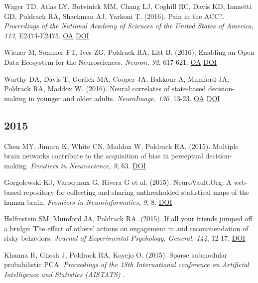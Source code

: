 \documentclass[10pt, letterpaper]{article}
\begin{document}
Wager TD, Atlas LY, Botvinick MM, Chang LJ, Coghill RC, Davis KD, Iannetti GD, Poldrack RA, Shackman AJ, Yarkoni T.  (2016). Pain in the ACC?. \textit{Proceedings of the National Academy of Sciences of the United States of America, 113}, E2474-E2475. \href{https://www.ncbi.nlm.nih.gov/pmc/articles/PMC4983860}{OA} \href{https://doi.org/10.1073/pnas.1600282113}{DOI} \vspace{2mm}

Wiener M, Sommer FT, Ives ZG, Poldrack RA, Litt B.  (2016). Enabling an Open Data Ecosystem for the Neurosciences. \textit{Neuron, 92}, 617-621. \href{https://doi.org/10.1016/j.neuron.2016.10.037}{OA} \href{https://doi.org/10.1016/j.neuron.2016.10.037}{DOI} \vspace{2mm}

Worthy DA, Davis T, Gorlick MA, Cooper JA, Bakkour A, Mumford JA, Poldrack RA, Maddox W.  (2016). Neural correlates of state-based decision-making in younger and older adults. \textit{NeuroImage, 130}, 13-23. \href{https://www.ncbi.nlm.nih.gov/pmc/articles/PMC4808466}{OA} \href{https://doi.org/10.1016/j.neuroimage.2015.12.004}{DOI} \vspace{2mm}

\subsection*{2015}Chen MY, Jimura K, White CN, Maddox W, Poldrack RA.  (2015). Multiple brain networks contribute to the acquisition of bias in perceptual decision-making. \textit{Frontiers in Neuroscience, 9}, 63. \href{https://doi.org/10.3389/fnins.2015.00063}{DOI} \vspace{2mm}

Gorgolewski KJ, Varoquaux G, Rivera G et al. (2015). NeuroVault.Org: A web-based repository for collecting and sharing unthresholded statistical maps of the human brain. \textit{Frontiers in Neuroinformatics, 9}, 8. \href{https://doi.org/10.3389/fninf.2015.00008}{DOI} \vspace{2mm}

Helfinstein SM, Mumford JA, Poldrack RA.  (2015). If all your friends jumped off a bridge: The effect of others' actions on engagement in and recommendation of risky behaviors. \textit{Journal of Experimental Psychology: General, 144}, 12-17. \href{https://doi.org/10.1037/xge0000043}{DOI} \vspace{2mm}

Khanna R, Ghosh J, Poldrack RA, Koyejo O.  (2015). Sparse submodular probabilistic PCA. \textit{Proceedings of the 18th International conference on Artificial Intelligence and Statistics (AISTATS) }. \vspace{2mm}
\end{document}

